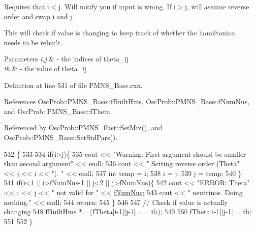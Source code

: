 Requires that i$<$j. Will notify you if input is wrong. If i$>$j, will assume reverse order and swap i and j.

This will check if value is changing to keep track of whether the hamiltonian needs to be rebuilt.


\begin{DoxyParams}{Parameters}
{\em i,j} & -\/ the indices of theta\+\_\+ij \\
\hline
{\em th} & -\/ the value of theta\+\_\+ij \\
\hline
\end{DoxyParams}


Definition at line 531 of file P\+M\+N\+S\+\_\+\+Base.\+cxx.



References Osc\+Prob\+::\+P\+M\+N\+S\+\_\+\+Base\+::f\+Built\+Hms, Osc\+Prob\+::\+P\+M\+N\+S\+\_\+\+Base\+::f\+Num\+Nus, and Osc\+Prob\+::\+P\+M\+N\+S\+\_\+\+Base\+::f\+Theta.



Referenced by Osc\+Prob\+::\+P\+M\+N\+S\+\_\+\+Fast\+::\+Set\+Mix(), and Osc\+Prob\+::\+P\+M\+N\+S\+\_\+\+Base\+::\+Set\+Std\+Pars().


\begin{DoxyCode}
532 \{
533 
534   \textcolor{keywordflow}{if}(i>j)\{
535     cout << \textcolor{stringliteral}{"Warning: First argument should be smaller than second argument"} << endl;
536     cout << \textcolor{stringliteral}{"         Setting reverse order (Theta"} << j << i << \textcolor{stringliteral}{"). "} << endl;
537     \textcolor{keywordtype}{int} temp = i;
538     i = j;
539     j = temp;
540   \}
541   \textcolor{keywordflow}{if}(i<1 || i>\hyperlink{classOscProb_1_1PMNS__Base_a24bb74bed63569dfe88b18fa6a08060e}{fNumNus}-1 || j<2 || j>\hyperlink{classOscProb_1_1PMNS__Base_a24bb74bed63569dfe88b18fa6a08060e}{fNumNus})\{
542     cout << \textcolor{stringliteral}{"ERROR: Theta"} << i << j << \textcolor{stringliteral}{" not valid for "} << \hyperlink{classOscProb_1_1PMNS__Base_a24bb74bed63569dfe88b18fa6a08060e}{fNumNus};
543     cout << \textcolor{stringliteral}{" neutrinos. Doing nothing."} << endl;
544     \textcolor{keywordflow}{return};
545   \}
546 
547   \textcolor{comment}{// Check if value is actually changing}
548   \hyperlink{classOscProb_1_1PMNS__Base_a9ac3cadeac8db1b90f3152f476244780}{fBuiltHms} *= (\hyperlink{classOscProb_1_1PMNS__Base_a1976887cd658dd86b2336c181f1470b4}{fTheta}[i-1][j-1] == th);
549 
550   \hyperlink{classOscProb_1_1PMNS__Base_a1976887cd658dd86b2336c181f1470b4}{fTheta}[i-1][j-1] = th;
551 
552 \}
\end{DoxyCode}
